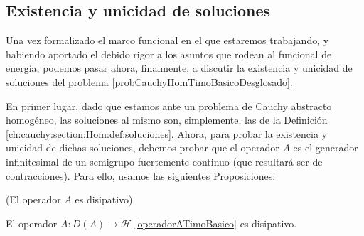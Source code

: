 \subsection{Existencia y unicidad de soluciones}
\label{ch:teoriaVigas:section:timoshenkoFunc:subsection:existenciaYUnicidad}

Una vez formalizado el marco funcional en el que estaremos trabajando, y habiendo aportado el debido rigor a los asuntos que rodean al funcional de energía, podemos pasar ahora, finalmente, a discutir la existencia y unicidad de soluciones del problema \eqref{probCauchyHomTimoBasicoDesglosado}.

En primer lugar, dado que estamos ante un problema de Cauchy abstracto homogéneo, las soluciones al mismo son, simplemente, las de la Definición \eqref{ch:cauchy:section:Hom:def:soluciones}. Ahora, para probar la existencia y unicidad de dichas soluciones, debemos probar que el operador $A$ es el generador infinitesimal de un semigrupo fuertemente continuo (que resultará ser de contracciones). Para ello, usamos las siguientes Proposiciones:

\begin{Proposicion}{(El operador $A$ es disipativo)}
\label{ch:teoriaVigas:prop:AesDisipativo}

    El operador $A : D(A) \rightarrow \mathcal{H}$ \eqref{operadorATimoBasico} es disipativo.
\end{Proposicion}

